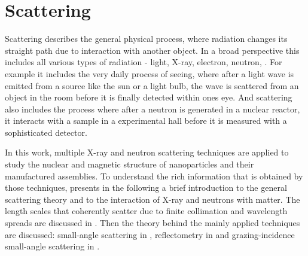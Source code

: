 \documentclass[\main/dresen_thesis.tex]{subfiles}
\renewcommand{\thisPath}{\main/chapters/theoreticalBackground/scattering}
\begin{document}
  \section{Scattering}\label{sec:theoreticalBackground:scattering}
    Scattering describes the general physical process, where radiation changes its straight path due to interaction with another object.
    In a broad perspective this includes all various types of radiation - light, X-ray, electron, neutron, \etc .
    For example it includes the very daily process of seeing, where after a light wave is emitted from a source like the sun or a light bulb, the wave is scattered from an object in the room before it is finally detected within ones eye.
    And scattering also includes the process where after a neutron is generated in a nuclear reactor, it interacts with a sample in a experimental hall before it is measured with a sophisticated detector.

    In this work, multiple X-ray and neutron scattering techniques are applied to study the nuclear and magnetic structure of nanoparticles and their manufactured assemblies.
    To understand the rich information that is obtained by those techniques,  presents in the following a brief introduction to the general scattering theory and  to the interaction of X-ray and neutrons with matter.
    The length scales that coherently scatter due to finite collimation and wavelength spreads are discussed in .
    Then the theory behind the mainly applied techniques are discussed: small-angle scattering in , reflectometry in  and grazing-incidence small-angle scattering in .

    
    
    
    
    
    
\end{document}
